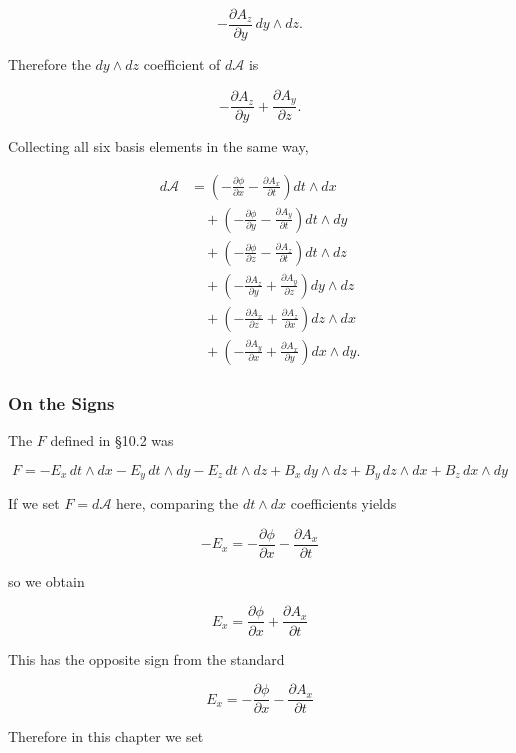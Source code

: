 \[
-\frac{\partial A_z}{\partial y}\,dy\wedge dz.
\]

Therefore the \(dy\wedge dz\) coefficient of \(d\mathcal{A}\) is

\[
-\frac{\partial A_z}{\partial y}
+
\frac{\partial A_y}{\partial z}.
\]

Collecting all six basis elements in the same way,

\[
\begin{aligned}
d\mathcal{A}
&=
\left(
-\frac{\partial\phi}{\partial x}
-
\frac{\partial A_x}{\partial t}
\right)
dt\wedge dx
\\[0.5em]
&\quad+
\left(
-\frac{\partial\phi}{\partial y}
-
\frac{\partial A_y}{\partial t}
\right)
dt\wedge dy
\\[0.5em]
&\quad+
\left(
-\frac{\partial\phi}{\partial z}
-
\frac{\partial A_z}{\partial t}
\right)
dt\wedge dz
\\[0.5em]
&\quad+
\left(
-\frac{\partial A_z}{\partial y}
+
\frac{\partial A_y}{\partial z}
\right)
dy\wedge dz
\\[0.5em]
&\quad+
\left(
-\frac{\partial A_x}{\partial z}
+
\frac{\partial A_z}{\partial x}
\right)
dz\wedge dx
\\[0.5em]
&\quad+
\left(
-\frac{\partial A_y}{\partial x}
+
\frac{\partial A_x}{\partial y}
\right)
dx\wedge dy.
\end{aligned}
\]

\hypertarget{on-the-signs}{%
\subsubsection{On the Signs}\label{on-the-signs}}

The \(F\) defined in §10.2 was

\[
F
=
-E_x\,dt\wedge dx
-
E_y\,dt\wedge dy
-
E_z\,dt\wedge dz
+
B_x\,dy\wedge dz
+
B_y\,dz\wedge dx
+
B_z\,dx\wedge dy
\]

If we set \(F=d\mathcal{A}\) here, comparing the \(dt\wedge dx\)
coefficients yields

\[
-E_x
=
-\frac{\partial\phi}{\partial x}
-
\frac{\partial A_x}{\partial t}
\]

so we obtain

\[
E_x
=
\frac{\partial\phi}{\partial x}
+
\frac{\partial A_x}{\partial t}
\]

This has the opposite sign from the standard

\[
E_x
=
-\frac{\partial\phi}{\partial x}
-
\frac{\partial A_x}{\partial t}
\]

Therefore in this chapter we set

